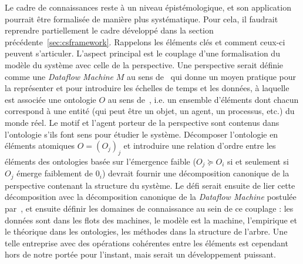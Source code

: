 {Le cadre de connaissances reste à un niveau épistémologique, et son application pourrait être formalisée de manière plus systématique. Pour cela, il faudrait reprendre partiellement le cadre développé dans la section précédente~\ref{sec:csframework}. Rappelons les éléments clés et comment ceux-ci peuvent s'articuler. L'aspect principal est le couplage d'une formalisation du modèle du système avec celle de la perspective. Une perspective serait définie comme une \emph{Dataflow Machine} $M$ au sens de~\cite{golden2012modeling} qui donne un moyen pratique pour la représenter et pour introduire les échelles de temps et les données, à laquelle est associée une ontologie $O$ au sens de~\cite{livet2010}, i.e. un ensemble d'éléments dont chacun correspond à une entité (qui peut être un objet, un agent, un processus, etc.) du monde réel. Le motif et l'agent porteur de la perspective sont contenus dans l'ontologie s'ils font sens pour étudier le système. Décomposer l'ontologie en éléments atomiques $O=(O_j)_j$ et introduire une relation d'ordre entre les éléments des ontologies basée sur l'émergence faible ($O_j\succcurlyeq O_i$ si et seulement si $O_j$ émerge faiblement de $0_i$) devrait fournir une décomposition canonique de la perspective contenant la structure du système. Le défi serait ensuite de lier cette décomposition avec la décomposition canonique de la \emph{Dataflow Machine} postulée par~\cite{golden2012modeling}, et ensuite définir les domaines de connaissance au sein de ce couplage : les données sont dans les flots des machines, le modèle est la machine, l'empirique et le théorique dans les ontologies, les méthodes dans la structure de l'arbre. Une telle entreprise avec des opérations cohérentes entre les éléments est cependant hors de notre portée pour l'instant, mais serait un développement puissant.
}



